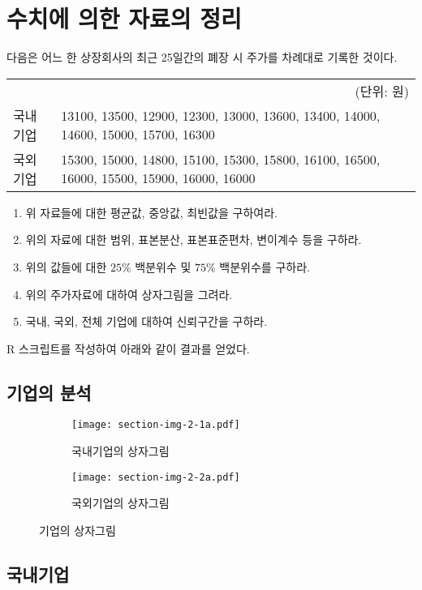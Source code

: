 \section{수치에 의한 자료의 정리}
다음은 어느 한 상장회사의 최근 25일간의 폐장 시 주가를 차례대로 기록한 것이다.

\begin{tabularx}{0.9\textwidth}{ l|X }
  \multicolumn{2}{r}{\small(단위: 원)} \\
  \noalign{\smallskip}\hline\noalign{\smallskip}
  국내기업 &
  13100, 13500, 12900, 12300, 13000, 13600, 13400, 14000, 14600, 15000,
  15700, 16300 \\
  국외기업 &
  15300, 15000, 14800, 15100, 15300, 15800, 16100, 16500, 16000, 15500,
  15900, 16000, 16000
\end{tabularx}

\begin{enumerate}
  \item 위 자료들에 대한 평균값, 중앙값, 최빈값을 구하여라.
  \item 위의 자료에 대한 범위, 표본분산, 표본표준편차, 변이계수 등을 구하라.
  \item 위의 값들에 대한 $25\%$ 백분위수 및 $75\%$ 백분위수를 구하라.
  \item 위의 주가자료에 대하여 상자그림을 그려라.
  \item 국내, 국외, 전체 기업에 대하여 신뢰구간을 구하라.
\end{enumerate}

R 스크립트를 작성하여 아래와 같이 결과를 얻었다.


\subsection{기업의 분석}
\begin{figure}[b]
  \begin{subfigure}[b]{0.5\textwidth}
    \centering
    \texttt{[image: section-img-2-1a.pdf]}
    \caption{국내기업의 상자그림}
  \end{subfigure}
  \begin{subfigure}[b]{0.5\textwidth}
    \centering
    \texttt{[image: section-img-2-2a.pdf]}
    \caption{국외기업의 상자그림}
  \end{subfigure}
  \caption{기업의 상자그림}
\end{figure}

\subsection{국내기업}

